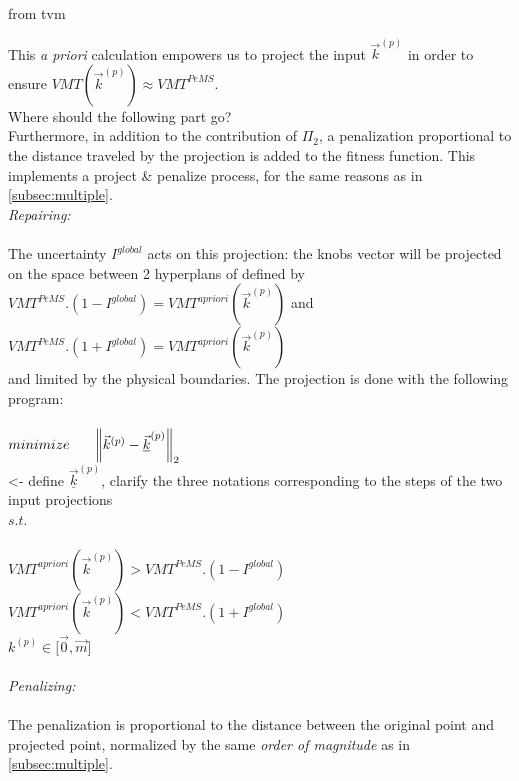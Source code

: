 \color{red} from tvm \color{black}





This \emph{a priori} calculation empowers us to project the input $\vec{k}^{(p)}$ in order to ensure $VMT(\vec{k}^{(p)})\approx VMT^{PeMS}$.\\

\color{red} Where should the following part go? \color{black}\\
Furthermore, in addition to the contribution of $\Pi_{2}$, a penalization proportional to the distance traveled by the projection is added to the fitness function. This implements a project \& penalize process, for the same reasons as in \ref{subsec:multiple}.\\
\emph{Repairing:}\\
\\
The uncertainty $I^{global}$ acts on this projection: the knobs vector will be projected on the space between 2 hyperplans of   defined by\\
$VMT^{PeMS}.(1-I^{global})=VMT^{apriori}(\vec{k}^{(p)})$ and\\
$VMT^{PeMS}.(1+I^{global})=VMT^{apriori}(\vec{k}^{(p)})$\\
and limited by the physical boundaries.
The projection is done with the following program:\\
\\
$minimize \ \ \ \ \ \norm{\vec{k}^{(p)}-\underline{\vec{k}}^{(p)}}_{2}$\\ \color{red}<- define $\underline{\vec{k}}^{(p)}$, clarify the three notations corresponding to the steps of the two input projections\color{black}\\
$s.t.$\\
\\
$VMT^{apriori}(\vec{k}^{(p)})>VMT^{PeMS}.(1-I^{global})$\\
$VMT^{apriori}(\vec{k}^{(p)})<VMT^{PeMS}.(1+I^{global})$\\
$k^{(p)}\in{[\vec{0},\vec{m}}]$\\
\\
\emph{Penalizing:}\\
\\
The penalization is proportional to the distance between the original point and projected point, normalized by the same \emph{order of magnitude} as in \ref{subsec:multiple}.\\
